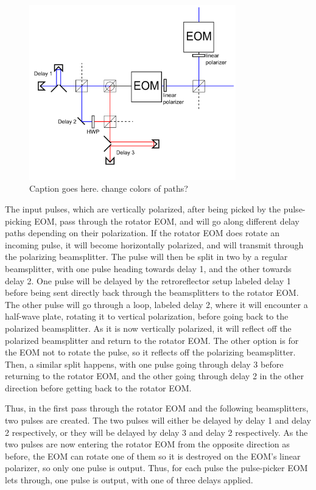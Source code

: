 \documentclass[pdftex,12pt,a4paper]{article}
\begin{document}
\begin{figure}[t]
\centering
\includegraphics[width=0.8\textwidth]{digdesign1.png}
\caption{Caption goes here. change colors of paths?}
\label{fig:digdesign1}
\end{figure}

The input pulses, which are vertically polarized, after being picked by the pulse-picking EOM, pass through the rotator EOM, and will go along different delay paths depending on their polarization. If the rotator EOM does rotate an incoming pulse, it will become horizontally polarized, and will transmit through the polarizing beamsplitter. The pulse will then be split in two by a regular beamsplitter, with one pulse heading towards delay 1, and the other towards delay 2. One pulse will be delayed by the retroreflector setup labeled delay 1 before being sent directly back through the beamsplitters to the rotator EOM. The other pulse will go through a loop, labeled delay 2, where it will encounter a half-wave plate, rotating it to vertical polarization, before going back to the polarized beamsplitter. As it is now vertically polarized, it will reflect off the polarized beamsplitter and return to the rotator EOM. The other option is for the EOM not to rotate the pulse, so it reflects off the polarizing beamsplitter. Then, a similar split happens, with one pulse going through delay 3 before returning to the rotator EOM, and the other going through delay 2 in the other direction before getting back to the rotator EOM.

Thus, in the first pass through the rotator EOM and the following beamsplitters, two pulses are created. The two pulses will either be delayed by delay 1 and delay 2 respectively, or they will be delayed by delay 3 and delay 2 respectively. As the two pulses are now entering the rotator EOM from the opposite direction as before, the EOM can rotate one of them so it is destroyed on the EOM's linear polarizer, so only one pulse is output. Thus, for each pulse the pulse-picker EOM lets through, one pulse is output, with one of three delays applied.
\end{document}
